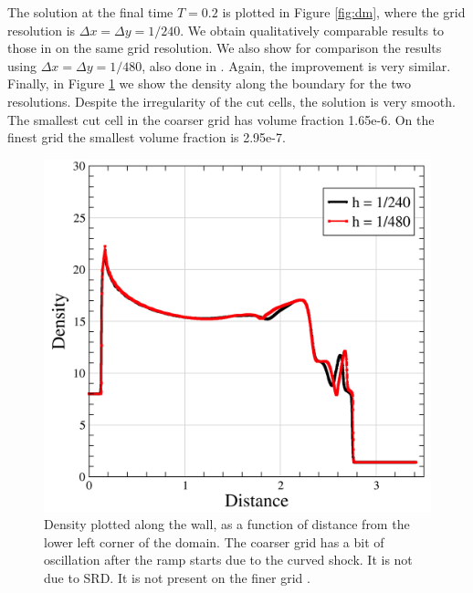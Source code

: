 The solution at the final time $T = 0.2$ is plotted in Figure \ref{fig:dm}, 
where the grid resolution is $\Delta x = \Delta y = 1/240$.
We obtain qualitatively comparable results to those in \cite{rkdg5} on 
the same grid resolution. We also show for comparison the results using 
$\Delta x = \Delta y = 1/480$, also done in \cite{rkdg5}. Again, the
improvement is very similar. Finally, in Figure \ref{fig:wedgeBndry} we
show the density along the boundary for the two resolutions. Despite the
irregularity of the cut cells, the solution is very smooth. The smallest
cut cell in the coarser grid has volume fraction 1.65e-6. On the finest
grid the smallest volume fraction is 2.95e-7. 

\begin{figure}[h]
\centering
\includegraphics[width=.7\linewidth]{figs/rampWall.png}
\caption{\sf Density plotted along the wall, as a function of distance from
the lower left corner of the domain. The coarser grid has a bit of
oscillation after the ramp starts due to the curved shock. It is not due to
SRD. It is not present on the finer grid .} \label{fig:wedgeBndry}
\end{figure}


